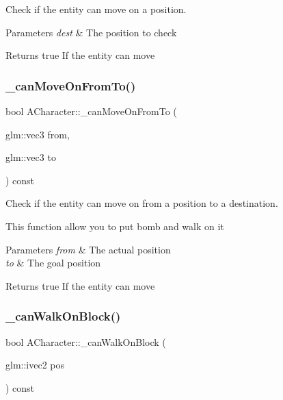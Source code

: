 Check if the entity can move on a position. 


\begin{DoxyParams}{Parameters}
{\em dest} & The position to check \\
\hline
\end{DoxyParams}
\begin{DoxyReturn}{Returns}
true If the entity can move 
\end{DoxyReturn}
\mbox{\label{class_a_character_a771fdf0a7773de142d51ed599f3d557d}} 
\subsubsection{\texorpdfstring{\+\_\+can\+Move\+On\+From\+To()}{\_canMoveOnFromTo()}}
{\footnotesize\ttfamily bool A\+Character\+::\+\_\+can\+Move\+On\+From\+To (\begin{DoxyParamCaption}\item[{glm\+::vec3}]{from,  }\item[{glm\+::vec3}]{to }\end{DoxyParamCaption}) const\hspace{0.3cm}{\ttfamily [protected]}}



Check if the entity can move on from a position to a destination. 

This function allow you to put bomb and walk on it


\begin{DoxyParams}{Parameters}
{\em from} & The actual position \\
\hline
{\em to} & The goal position \\
\hline
\end{DoxyParams}
\begin{DoxyReturn}{Returns}
true If the entity can move 
\end{DoxyReturn}
\mbox{\label{class_a_character_a82a72081a1261d749da88f4464757008}} 
\subsubsection{\texorpdfstring{\+\_\+can\+Walk\+On\+Block()}{\_canWalkOnBlock()}}
{\footnotesize\ttfamily bool A\+Character\+::\+\_\+can\+Walk\+On\+Block (\begin{DoxyParamCaption}\item[{glm\+::ivec2}]{pos }\end{DoxyParamCaption}) const\hspace{0.3cm}{\ttfamily [protected]}}



